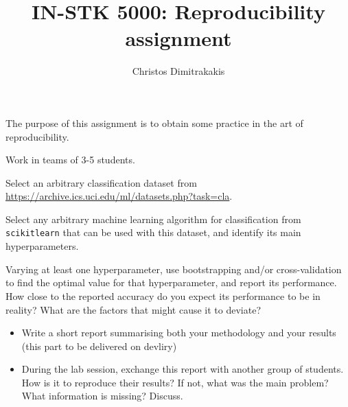 \documentclass[a4paper]{article}
\title{IN-STK 5000: Reproducibility assignment}
\author{Christos Dimitrakakis}
\begin{document}
\maketitle
The purpose of this assignment is to obtain some practice in the art of reproducibility.

\begin{exercise}
  Work in teams of 3-5 students.

  Select an arbitrary classification dataset from \url{https://archive.ics.uci.edu/ml/datasets.php?task=cla}. 

  Select any arbitrary machine learning algorithm for classification
  from \texttt{scikitlearn} that can be used with this dataset, and identify its main hyperparameters.
    
  Varying at least one hyperparameter, use bootstrapping and/or
  cross-validation to find the optimal value for that hyperparameter,
  and report its performance. How close to the reported accuracy do
  you expect its performance to be in reality?  What are the factors
  that might cause it to deviate?
  
  \begin{itemize}
  \item Write a short report summarising both your methodology and
    your results (this part to be delivered on devliry)

  \item During the lab session, exchange this report with another
    group of students.  How is it to reproduce their results? If not,
    what was the main problem? What information is missing? Discuss.
  \end{itemize}


\end{exercise}
\end{document}
